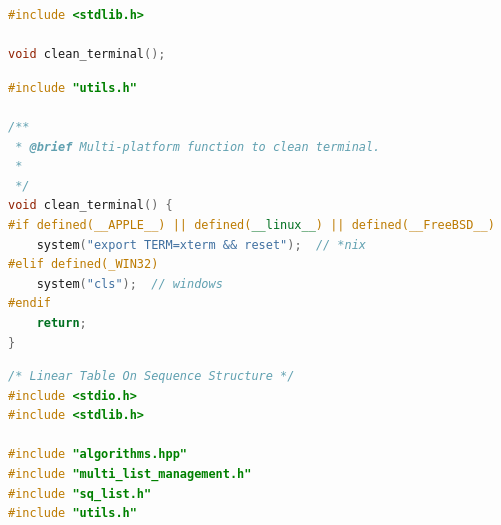 \documentclass[supercite]{Experimental_Report}
\theoremstyle{definition}
\begin{document}
\newpage
\begin{lstlisting}[caption={$utils.h$}, language=C++, frame=single]
#include <stdlib.h>

void clean_terminal();
\end{lstlisting}

\begin{lstlisting}[caption={$utils.cpp$}, language=C++, frame=single]
#include "utils.h"

/**
 * @brief Multi-platform function to clean terminal.
 *
 */
void clean_terminal() {
#if defined(__APPLE__) || defined(__linux__) || defined(__FreeBSD__)
    system("export TERM=xterm && reset");  // *nix
#elif defined(_WIN32)
    system("cls");  // windows
#endif
    return;
}
\end{lstlisting}

\newpage
\begin{lstlisting}[caption={$main.cpp$}, language=C++, frame=single]
/* Linear Table On Sequence Structure */
#include <stdio.h>
#include <stdlib.h>

#include "algorithms.hpp"
#include "multi_list_management.h"
#include "sq_list.h"
#include "utils.h"


\end{lstlisting}
\end{document}
